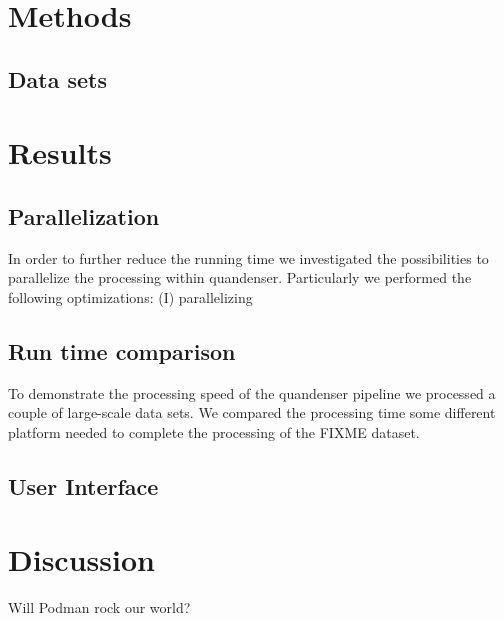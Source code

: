 \documentclass[11pt]{article}
\begin{document}
\section*{Methods}

\subsection*{Data sets}

\section*{Results}

\subsection*{Parallelization}
In order to further reduce the running time we investigated the possibilities to parallelize the processing within quandenser. Particularly we performed the following optimizations:
(I) parallelizing


\subsection*{Run time comparison}

To demonstrate the processing speed of the quandenser pipeline we processed a couple of large-scale data sets.
We compared the processing time some different platform needed to complete the processing of the FIXME dataset.


\subsection*{User Interface}


\section*{Discussion}

Will Podman rock our world?



\end{document}
